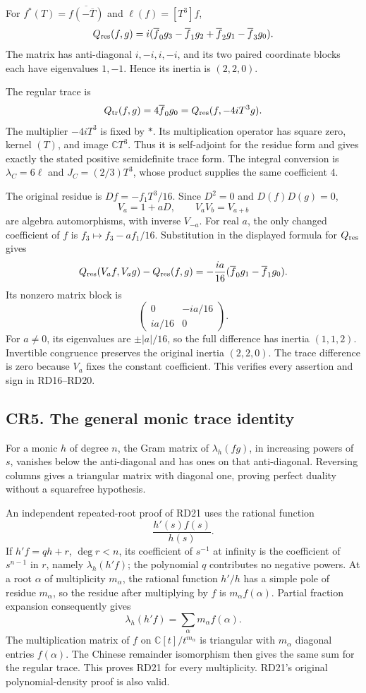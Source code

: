 \documentclass[
]{article}
\begin{document}
For \(f^*(T)=\overline{f(-\overline T)}\) and \(\ell(f)=[T^3]f\), \[
Q_{\rm res}(f,g)
=i(\overline f_0g_3-\overline f_1g_2+\overline f_2g_1-\overline f_3g_0).
\] The matrix has anti-diagonal \(i,-i,i,-i\), and its two paired
coordinate blocks each have eigenvalues \(1,-1\). Hence its inertia is
\((2,2,0)\).

The regular trace is \[
Q_{\rm tr}(f,g)=4\overline f_0g_0
=Q_{\rm res}(f,-4iT^3g).
\] The multiplier \(-4iT^3\) is fixed by \(*\). Its multiplication
operator has square zero, kernel \((T)\), and image \(\mathbb CT^3\).
Thus it is self-adjoint for the residue form and gives exactly the
stated positive semidefinite trace form. The integral conversion is
\(\lambda_C=6\ell\) and \(J_C=(2/3)T^3\), whose product supplies the
same coefficient 4.

The original residue is \(Df=-f_1T^3/16\). Since \(D^2=0\) and
\(D(f)D(g)=0\), \[
V_a=1+aD,\qquad V_aV_b=V_{a+b}
\] are algebra automorphisms, with inverse \(V_{-a}\). For real \(a\),
the only changed coefficient of \(f\) is \(f_3\mapsto f_3-af_1/16\).
Substitution in the displayed formula for \(Q_{\rm res}\) gives \[
Q_{\rm res}(V_af,V_ag)-Q_{\rm res}(f,g)
=-\frac{ia}{16}(\overline f_0g_1-\overline f_1g_0).
\] Its nonzero matrix block is \[
\begin{pmatrix}0&-ia/16\\ia/16&0\end{pmatrix}.
\] For \(a\ne0\), its eigenvalues are \(\pm|a|/16\), so the full
difference has inertia \((1,1,2)\). Invertible congruence preserves the
original inertia \((2,2,0)\). The trace difference is zero because
\(V_a\) fixes the constant coefficient. This verifies every assertion
and sign in RD16--RD20.

\subsection{CR5. The general monic trace
identity}\label{cr5.-the-general-monic-trace-identity}

For a monic \(h\) of degree \(n\), the Gram matrix of \(\lambda_h(fg)\),
in increasing powers of \(s\), vanishes below the anti-diagonal and has
ones on that anti-diagonal. Reversing columns gives a triangular matrix
with diagonal one, proving perfect duality without a squarefree
hypothesis.

An independent repeated-root proof of RD21 uses the rational function \[
\frac{h'(s)f(s)}{h(s)}.
\] If \(h'f=qh+r\), \(\deg r<n\), its coefficient of \(s^{-1}\) at
infinity is the coefficient of \(s^{n-1}\) in \(r\), namely
\(\lambda_h(h'f)\); the polynomial \(q\) contributes no negative powers.
At a root \(\alpha\) of multiplicity \(m_\alpha\), the rational function
\(h'/h\) has a simple pole of residue \(m_\alpha\), so the residue after
multiplying by \(f\) is \(m_\alpha f(\alpha)\). Partial fraction
expansion consequently gives \[
\lambda_h(h'f)=\sum_\alpha m_\alpha f(\alpha).
\] The multiplication matrix of \(f\) on \(\mathbb C[t]/t^{m_\alpha}\)
is triangular with \(m_\alpha\) diagonal entries \(f(\alpha)\). The
Chinese remainder isomorphism then gives the same sum for the regular
trace. This proves RD21 for every multiplicity. RD21's original
polynomial-density proof is also valid.
\end{document}
